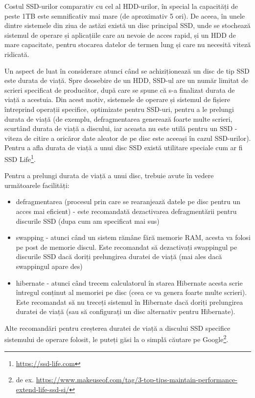 Costul SSD-urilor comparativ cu cel al HDD-urilor, în special la capacități de
peste 1TB este semnificativ mai mare (de aproximativ 5 ori). De aceea, în
unele dintre sistemele din ziua de astăzi există un disc principal SSD, unde se stochează
sistemul de operare și aplicațiile care au nevoie de acces rapid, și un
HDD de mare capacitate, pentru stocarea datelor de termen lung și care nu
necesită viteză ridicată.

Un aspect de luat în considerare atunci când se achiziționează un disc de tip SSD
este durata de viață. Spre deosebire de un HDD, SSD-ul are un număr limitat de
scrieri specificat de producător, după care se spune că s-a finalizat durata de
viață a acestuia. Din acest motiv, sistemele de operare și sistemul de fișiere
întreprind operații specifice, optimizate pentru SSD-uri, pentru a
le prelungi durata de viață (de exemplu, defragmentarea generează foarte multe
scrieri, scurtând durata de viață a discului, iar aceasta nu este utilă pentru
un SSD - viteza de citire a oricăror date aleator de pe disc este aceeași în
cazul SSD-urilor). Pentru a afla durata de viață a unui disc SSD există utilitare
speciale cum ar fi SSD Life\footnote{\url{https://ssd-life.com}}.

Pentru a prelungi durata de viață a unui disc, trebuie avute
în vedere următoarele facilități:

\begin{itemize}
  \item defragmentarea (procesul prin care se rearanjează datele pe disc
    pentru un acces mai eficient) - este recomandată dezactivarea
    defragmentării pentru discurile SSD (dupa cum am specificat mai
    sus)
  \item swapping - atunci când un sistem rămâne fără memorie RAM, acesta
    va folosi pe post de memorie discul. Este recomandat să
    dezactivați swappingul pe discurile SSD dacă doriți prelungirea
    duratei de viață (mai ales dacă swappingul apare des)
  \item hibernate - atunci când trecem calculatorul în starea Hibernate
    acesta scrie întregul conținut al memoriei pe disc (ceea ce va
    genera foarte multe scrieri). Este recomandat să nu treceți
    sistemul în Hibernate dacă doriți prelungirea duratei de viață
    (sau să configurați un disc alternativ pentru Hibernate).
\end{itemize}

Alte recomandări pentru creșterea duratei de viață a discului SSD specifice
sistemului de operare folosit, le puteți găsi la o simplă căutare pe Google\footnote{de ex. \url{https://www.makeuseof.com/tag/3-top-tips-maintain-performance-extend-life-ssd-si/}}.


